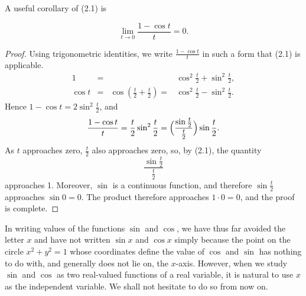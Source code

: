A useful corollary of (2.1) is

\begin{theorem} %
$$
\lim_{t \rightarrow 0} \frac{1 - \cos t}{t} = 0. 
$$
\end{theorem}


\begin{proof}
Using trigonometric identities, we write $\frac{1 - \cos t}{t}$ in such a form that (2.1) is applicable. 
$$
\begin{array}{rcll}
      1 &=&                                                & \cos^{2} \frac{t}{2} + \sin^{2}\frac{t}{ 2},\\
\cos t &=& \cos (\frac{t}{2} + \frac{t}{2}) =& \cos^{2} \frac{t}{2} - \sin^{2} \frac{t}{2}.
\end{array}
$$
Hence $1 -  \cos t = 2 \sin^{2} \frac{t}{2}$, and 
$$
\frac{1 - \cos t}{t} = \frac{t}{2} \sin^{2} \frac{t}{2} 
= \Bigl(\frac{\sin \frac{t}{2}}{\frac{t}{2}} \Bigr) \sin \frac{t}{2}.
$$
As $t$ approaches zero, $\frac{t}{2}$ also approaches zero, so, by (2.1), the quantity 
$$
\frac{\sin \frac{t}{2}}{\frac{t}{2}}
$$
approaches 1.  Moreover, $\sin$ is a continuous function, and therefore $\sin \frac{t}{2}$ approaches $\sin 0 = 0$. The product therefore approaches $1 \cdot 0 = 0$, and the proof is complete.
\end{proof}

In writing values of the functions $\sin$ and $\cos$, we have thus far avoided the letter $x$ and have not written $\sin x$ and $\cos x$ simply because the point on the circle $x^{2} + y^{2} = 1$ whose coordinates define the value of $\cos$ and $\sin$ has nothing to do with, and generally does not lie on, the $x$-axis. However, when we study $\sin$ and $\cos$ as two real-valued functions of a real variable, it is natural to use $x$ as the independent variable. 
We shall not hesitate to do so from now on.


